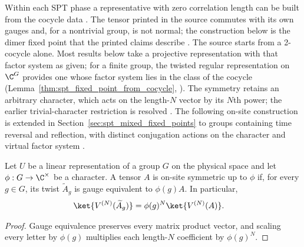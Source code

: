 Within each SPT phase a representative with zero correlation length can be built
from the cocycle data \cite[Section~III.A]{Cirac2021Matrix}.  The tensor printed in
the source commutes with its own gauges and, for a nontrivial group, is not normal;
the construction below
is the dimer fixed point that the printed claims describe
\cite{gap:rmp_spt_fixed_point_tensor}.  The source starts from a 2-cocycle alone.
Most results below take a projective representation with that factor system as
given; for a finite group, the twisted regular representation on $\C^G$ provides
one whose factor system lies in the class of the cocycle
(Lemma~\ref{thm:spt_fixed_point_from_cocycle},
\cite{gap:rmp_spt_fixed_point_supplied_representation}). The symmetry retains
an arbitrary character, which acts on the length-$N$ vector by its $N$th power;
the earlier trivial-character restriction is resolved
\cite{gap:rmp_spt_fixed_point_trivial_character}.
The following on-site construction is extended in
Section~\ref{sec:spt_mixed_fixed_points} to groups containing time reversal
and reflection, with distinct conjugation actions on the character and
virtual factor system \cite{gap:rmp_spt_fixed_point_onsite_scope}.

\begin{definition}%
    \label{def:on_site_symmetric_character}
    \leanok
    Let $U$ be a linear representation of a group $G$ on the physical
    space and let $\phi:G\to\C^\times$ be a character. A tensor $A$ is
    on-site symmetric up to $\phi$ if, for every $g\in G$, its twist
    $\widetilde A_g$ is gauge equivalent to $\phi(g)A$. In particular,
    \begin{align}
        \ket{V^{(N)}(\widetilde A_g)}
         & =\phi(g)^N\ket{V^{(N)}(A)}.
        \label{eq:spt_character_vector}
    \end{align}
\end{definition}
\begin{proof}
    \leanok
    Gauge equivalence preserves every matrix product vector, and scaling
    every letter by $\phi(g)$ multiplies each length-$N$ coefficient
    by $\phi(g)^N$.
\end{proof}

